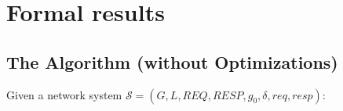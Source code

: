 \section{Formal results}
\label{sec:formal-results}





\subsection{The Algorithm (without Optimizations)}

Given a network system \(\mathcal S= (G, L, \mathit{REQ},  \mathit{RESP}, g_0, \delta, \mathit{req}, \mathit{resp})\):  

